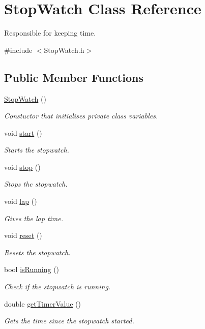 \hypertarget{classStopWatch}{\section{Stop\-Watch Class Reference}
\label{classStopWatch}
}


Responsible for keeping time.  




{\ttfamily \#include $<$Stop\-Watch.\-h$>$}

\subsection*{Public Member Functions}
\begin{DoxyCompactItemize}
\item 
\hyperlink{classStopWatch_ad715945060eeb23baa3c036ad19b1edb}{Stop\-Watch} ()
\begin{DoxyCompactList}\small\item\em Constuctor that initialises private class variables. \end{DoxyCompactList}\item 
void \hyperlink{classStopWatch_a09a3c8f9ab03d7b28e4f8b90a833974e}{start} ()
\begin{DoxyCompactList}\small\item\em Starts the stopwatch. \end{DoxyCompactList}\item 
void \hyperlink{classStopWatch_a6e80b598d9304e37d8768b716e713e0e}{stop} ()
\begin{DoxyCompactList}\small\item\em Stops the stopwatch. \end{DoxyCompactList}\item 
void \hyperlink{classStopWatch_a8e25f50201831578ad0b588a4ce16504}{lap} ()
\begin{DoxyCompactList}\small\item\em Gives the lap time. \end{DoxyCompactList}\item 
void \hyperlink{classStopWatch_a1c0dcc57c615559f24bc9f8759271a9d}{reset} ()
\begin{DoxyCompactList}\small\item\em Resets the stopwatch. \end{DoxyCompactList}\item 
bool \hyperlink{classStopWatch_a4358045d32002cb83ec62d1ebb9fb5ca}{is\-Running} ()
\begin{DoxyCompactList}\small\item\em Check if the stopwatch is running. \end{DoxyCompactList}\item 
double \hyperlink{classStopWatch_a29945e425c084bb7df859c4c10cbd9fe}{get\-Timer\-Value} ()
\begin{DoxyCompactList}\small\item\em Gets the time since the stopwatch started. \end{DoxyCompactList}\end{DoxyCompactItemize}
